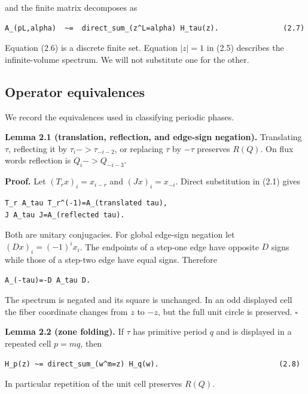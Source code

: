 and the finite matrix decomposes as

\begin{lstlisting}[language={}]
A_(pL,alpha)  ~=  direct_sum_(z^L=alpha) H_tau(z).               (2.7)
\end{lstlisting}

Equation (2.6) is a discrete finite set. Equation \(|z|=1\) in (2.5) describes
the infinite-volume spectrum. We will not substitute one for the other.

\subsection{Operator equivalences}

We record the equivalences used in classifying periodic phases.

\textbf{Lemma 2.1 (translation, reflection, and edge-sign negation).} Translating \(\tau\),
reflecting it by \(\tau_i -> \tau_{-i-2}\), or replacing \(\tau\) by \(-\tau\) preserves
\(R(Q)\). On flux words reflection is \(Q_i -> Q_{-i-3}\).

\textbf{Proof.} Let \((T_r x)_i=x_{i-r}\) and \((Jx)_i=x_{-i}\). Direct substitution in
(2.1) gives

\begin{lstlisting}[language={}]
T_r A_tau T_r^(-1)=A_(translated tau),
J A_tau J=A_(reflected tau).
\end{lstlisting}

Both are unitary conjugacies. For global edge-sign negation let
\((Dx)_i=(-1)^i x_i\). The
endpoints of a step-one edge have opposite \(D\) signs while those of a step-two
edge have equal signs. Therefore

\begin{lstlisting}[language={}]
A_(-tau)=-D A_tau D.
\end{lstlisting}

The spectrum is negated and its square is unchanged. In an odd displayed cell
the fiber coordinate changes from \(z\) to \(-z\), but the full unit circle is
preserved. \(\square\)

\textbf{Lemma 2.2 (zone folding).}  If \(\tau\) has primitive period \(q\) and is
displayed in a repeated cell \(p=mq\), then

\begin{lstlisting}[language={}]
H_p(z) ~= direct_sum_(w^m=z) H_q(w).                            (2.8)
\end{lstlisting}

In particular repetition of the unit cell preserves \(R(Q)\).

